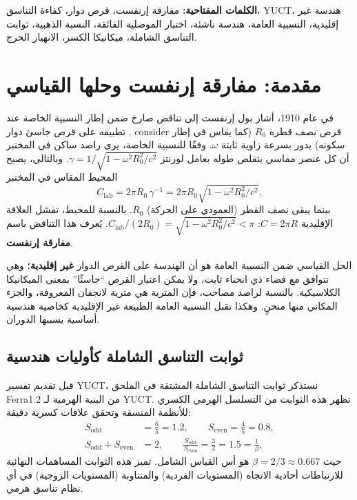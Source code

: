 \documentclass[12pt,a4paper]{article}
\newcommand{\betaf}{\beta}
\newcommand{\Sodd}{S_{\mathrm{odd}}}
\newcommand{\Seven}{S_{\mathrm{even}}}
\begin{document}
\begin{titlepage}
\begin{center}
			\noindent \textbf{الكلمات المفتاحية:} مفارقة إرنفست، قرص دوار، كفاءة التناسق، YUCT، هندسة غير إقليدية، النسبية العامة، هندسة ناشئة، اختبار الموصلية الفائقة، النسبة الذهبية، ثوابت التناسق الشاملة، ميكانيكا الكسر، الانهيار الحرج.
		\end{center}
	\end{titlepage}
	
	\tableofcontents
	\newpage
	
	\section{مقدمة: مفارقة إرنفست وحلها القياسي}
	\label{sec:intro}
	
	في عام 1910، أشار بول إرنفست إلى تناقض صارخ ضمن إطار النسبية الخاصة عند تطبيقه على قرص جاسئ دوار \cite{Ehrenfest1909}. consider قرص نصف قطره \(R_0\) (كما يقاس في إطار سكونه) يدور بسرعة زاوية ثابتة \(\omega\). وفقًا للنسبية الخاصة، يرى راصد ساكن في المختبر أن كل عنصر مماسي يتقلص طوله بعامل لورنتز \(\gamma = 1/\sqrt{1 - \omega^2 R_0^2/c^2}\). وبالتالي، يصبح المحيط المقاس في المختبر
	\[
	C_{\text{lab}} = 2\pi R_0 \, \gamma^{-1} = 2\pi R_0 \sqrt{1 - \omega^2 R_0^2/c^2},
	\]
	بينما يبقى نصف القطر (العمودي على الحركة) \(R_0\). بالنسبة للمحيط، تفشل العلاقة الإقليدية \(C = 2\pi R\): \(C_{\text{lab}}/(2R_0) = \sqrt{1 - \omega^2 R_0^2/c^2} < \pi\). يُعرف هذا التناقض باسم \textbf{مفارقة إرنفست}.
	
	الحل القياسي ضمن النسبية العامة هو أن الهندسة على القرص الدوار \textbf{غير إقليدية}؛ وهي تتوافق مع فضاء ذي انحناء ثابت، ولا يمكن اعتبار القرص ``جاسئًا'' بمعنى الميكانيكا الكلاسيكية. بالنسبة لراصد مصاحب، فإن المترية هي مترية لانجفان المعروفة، والجزء المكاني منها منحنٍ. وهكذا تقبل النسبية العامة الطبيعة غير الإقليدية كخاصية هندسية أساسية يسببها الدوران.
	
	\subsection{ثوابت التناسق الشاملة كأوليات هندسية}
	
	قبل تقديم تفسير YUCT، نستذكر ثوابت التناسق الشاملة المشتقة في الملحق Ferra1.2 من البنية الهرمية لـ YUCT. تظهر هذه الثوابت من التسلسل الهرمي الكسري للأنظمة المنسقة وتحقق علاقات كسرية دقيقة:
	\begin{align}
		\Sodd &= \frac{6}{5} = 1.2, \qquad \Seven = \frac{4}{5} = 0.8, \\
		\Sodd + \Seven &= 2, \qquad \frac{\Sodd}{\Seven} = \frac{3}{2} = 1.5 = \frac{1}{\betaf},
	\end{align}
	حيث \(\betaf = 2/3 \approx 0.667\) هو أس القياس الشامل. تميز هذه الثوابت المساهمات النهائية للارتباطات أحادية الاتجاه (المستويات الفردية) والمتناوبة (المستويات الزوجية) في أي نظام تناسق هرمي.
	
\end{document}
